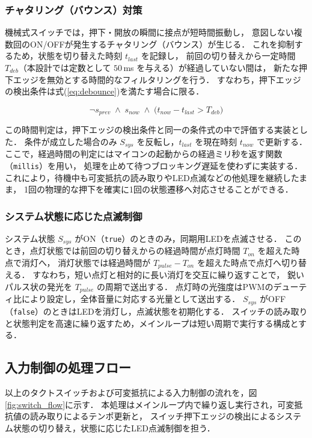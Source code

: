 \documentclass[lualatex,book,openany,paper=a4paper,jafontsize=11.5pt,jafontscale=1.05]{jlreq}
\begin{document}
\subsubsection{チャタリング（バウンス）対策}
機械式スイッチでは，押下・開放の瞬間に接点が短時間振動し，
意図しない複数回のON/OFFが発生するチャタリング（バウンス）が生じる．
これを抑制するため，状態を切り替えた時刻 $t_{last}$ を記録し，
前回の切り替えから一定時間 $T_{deb}$（本設計では定数として $50$\,ms を与える）が経過していない間は，
新たな押下エッジを無効とする時間的なフィルタリングを行う．
すなわち，押下エッジの検出条件は式(\ref{eq:debounce})を満たす場合に限る．

\begin{equation}
  \lnot s_{prev} \;\land\; s_{now} \;\land\; \bigl(t_{now} - t_{last} > T_{deb}\bigr)
  \label{eq:debounce}
\end{equation}

この時間判定は，押下エッジの検出条件と同一の条件式の中で評価する実装とした．
条件が成立した場合のみ $S_{sys}$ を反転し，$t_{last}$ を現在時刻 $t_{now}$ で更新する．
ここで，経過時間の判定にはマイコンの起動からの経過ミリ秒を返す関数（\texttt{millis}）を用い，
処理を止めて待つブロッキング遅延を使わずに実装する．
これにより，待機中も可変抵抗の読み取りやLED点滅などの他処理を継続したまま，
1回の物理的な押下を確実に1回の状態遷移へ対応させることができる．

\subsubsection{システム状態に応じた点滅制御}
システム状態 $S_{sys}$ がON（\texttt{true}）のときのみ，同期用LEDを点滅させる．
このとき，点灯状態では前回の切り替えからの経過時間が点灯時間 $T_{on}$ を超えた時点で消灯へ，
消灯状態では経過時間が $T_{pulse}-T_{on}$ を超えた時点で点灯へ切り替える．
すなわち，短い点灯と相対的に長い消灯を交互に繰り返すことで，
鋭いパルス状の発光を $T_{pulse}$ の周期で送出する．
点灯時の光強度はPWMのデューティ比により設定し，全体音量に対応する光量として送出する．
$S_{sys}$ がOFF（\texttt{false}）のときはLEDを消灯し，点滅状態を初期化する．
スイッチの読み取りと状態判定を高速に繰り返すため，メインループは短い周期で実行する構成とする．

\subsection{入力制御の処理フロー}
以上のタクトスイッチおよび可変抵抗による入力制御の流れを，図\ref{fig:switch_flow}に示す．
本処理はメインループ内で繰り返し実行され，可変抵抗値の読み取りによるテンポ更新と，
スイッチ押下エッジの検出によるシステム状態の切り替え，状態に応じたLED点滅制御を担う．
\end{document}
